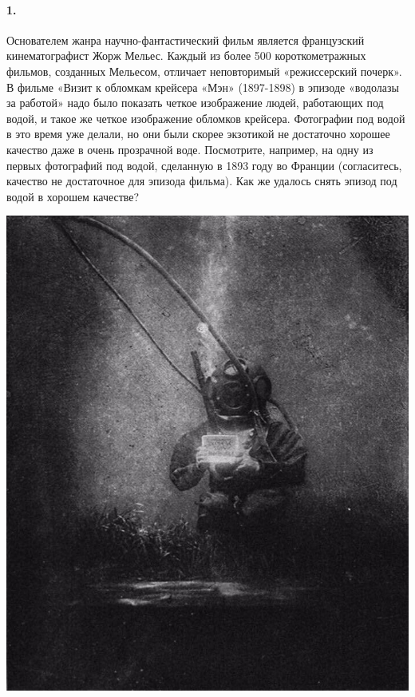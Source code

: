 \documentclass[11pt,a4paper]{article}
\begin{document}
\begin{minipage}{.6\textwidth}
  \paragraph{1.}
  Основателем жанра научно-фантастический фильм является французский
  кинематографист Жорж Мельес. Каждый из более 500 короткометражных фильмов,
  созданных Мельесом, отличает неповторимый «режиссерский почерк». В фильме
  «Визит к обломкам крейсера «Мэн» (1897-1898) в эпизоде «водолазы за работой»
  надо было показать четкое изображение людей, работающих под водой, и такое
  же четкое изображение обломков крейсера. Фотографии под водой в это время
  уже делали, но они были скорее экзотикой не достаточно хорошее качество даже
  в очень прозрачной воде. Посмотрите, например, на одну из первых фотографий
  под водой, сделанную в 1893 году во Франции (согласитесь, качество не
  достаточное для эпизода фильма). Как же удалось снять эпизод под водой в
  хорошем качестве?
\end{minipage}\hfill
\begin{minipage}{.35\textwidth}
  \includegraphics[width=\textwidth]{Bild-1.jpg}
\end{minipage}
\medskip
\end{document}
